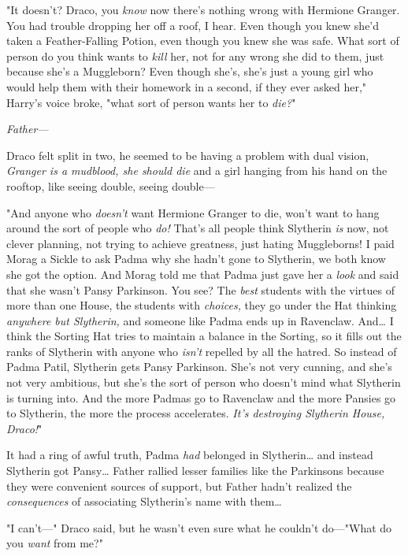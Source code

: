 "It doesn't? Draco, you \emph{know} now there's nothing wrong with Hermione 
Granger. You had trouble dropping her off a roof, I hear. Even though you knew 
she'd taken a Feather-Falling Potion, even though you knew she was safe. What 
sort of person do you think wants to \emph{kill} her, not for any wrong she did 
to them, just because she's a Muggleborn? Even though she's, she's just a young 
girl who would help them with their homework in a second, if they ever asked 
her," Harry's voice broke, "what sort of person wants her to \emph{die?}"

\emph{Father---}

Draco felt split in two, he seemed to be having a problem with dual vision, 
\emph{Granger is a mudblood, she should die} and a girl hanging from his hand 
on the rooftop, like seeing double, seeing double---

"And anyone who \emph{doesn't} want Hermione Granger to die, won't want to hang 
around the sort of people who \emph{do!} That's all people think Slytherin 
\emph{is} now, not clever planning, not trying to achieve greatness, just 
hating Muggleborns! I paid Morag a Sickle to ask Padma why she hadn't gone to 
Slytherin, we both know she got the option. And Morag told me that Padma just 
gave her a \emph{look} and said that she wasn't Pansy Parkinson. You see? The 
\emph{best} students with the virtues of more than one House, the students with 
\emph{choices,} they go under the Hat thinking \emph{anywhere but Slytherin,} 
and someone like Padma ends up in Ravenclaw. And{\ldots} I think the Sorting 
Hat tries to maintain a balance in the Sorting, so it fills out the ranks of 
Slytherin with anyone who \emph{isn't} repelled by all the hatred. So instead 
of Padma Patil, Slytherin gets Pansy Parkinson. She's not very cunning, and 
she's not very ambitious, but she's the sort of person who doesn't mind what 
Slytherin is turning into. And the more Padmas go to Ravenclaw and the more 
Pansies go to Slytherin, the more the process accelerates. \emph{It's 
destroying Slytherin House, Draco!}"

It had a ring of awful truth, Padma \emph{had} belonged in Slytherin{\ldots} 
and instead Slytherin got Pansy{\ldots} Father rallied lesser families like the 
Parkinsons because they were convenient sources of support, but Father hadn't 
realized the \emph{consequences} of associating Slytherin's name with 
them{\ldots}

"I can't---" Draco said, but he wasn't even sure what he couldn't do---"What do 
you \emph{want} from me?"

